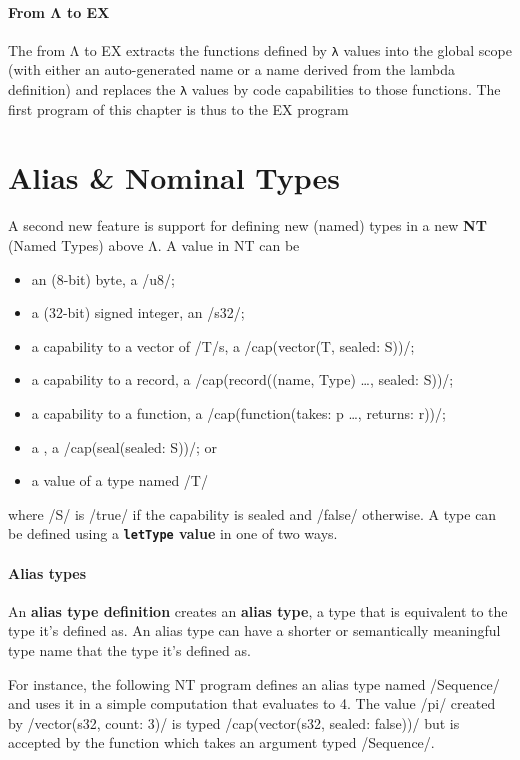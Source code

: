 \documentclass[main.tex]{subfiles}
\begin{document}
\paragraph{From Λ to EX} The  from Λ to EX extracts the functions defined by \texttt{λ} values into the global scope (with either an auto-generated name or a name derived from the lambda definition) and replaces the \texttt{λ} values by code capabilities to those functions. The first program of this chapter is thus \lowered{} to the EX program

\section{Alias \& Nominal Types} \label{sct:named-ty}
A second new feature is support for defining new (named) types in a new  \textbf{NT} (Named Types) above Λ. A value in NT can be
\begin{itemize}[nosep]
	\item an (8-bit) byte, a \iil/u8/;
	\item a (32-bit) signed integer, an \iil/s32/;
	\item a capability to a vector of \iil/T/s, a \iil/cap(vector(T, sealed: S))/;
	\item a capability to a record, a \iil/cap(record((name, Type) …, sealed: S))/;
	\item a capability to a function, a \iil/cap(function(takes: p …, returns: r))/;
	\item a , a \iil/cap(seal(sealed: S))/; or
	\item a value of a type named \iil/T/
\end{itemize}
where \iil/S/ is \iil/true/ if the capability is sealed and \iil/false/ otherwise. A type can be defined using a \textbf{\texttt{letType} value} in one of two ways.

\paragraph{Alias types} An \textbf{alias type definition} creates an \textbf{alias type}, a type that is equivalent to the type it's defined as. An alias type can have a shorter or semantically meaningful type name that the type it's defined as.

For instance, the following NT program defines an alias type named \iil/Sequence/ and uses it in a simple computation that evaluates to 4. The value \iil/pi/ created by \iil/vector(s32, count: 3)/ is typed \iil/cap(vector(s32, sealed: false))/ but is accepted by the function which takes an argument typed \iil/Sequence/.
\end{document}
